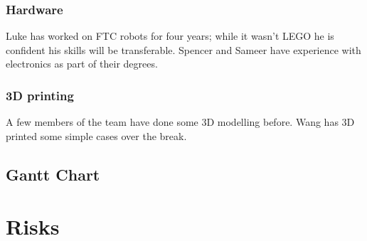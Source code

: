 \documentclass[onecolumn]{IEEEtran}
\begin{document}
\subsubsection{Hardware}

Luke has worked on FTC robots for four years; while it wasn’t LEGO he is confident his skills will be transferable. Spencer and Sameer have experience with electronics as part of their degrees.

\subsubsection{3D printing}

A few members of the team have done some 3D modelling before. Wang has 3D printed some simple cases over the break.

\subsection{Gantt Chart}


\section{Risks}
\end{document}
